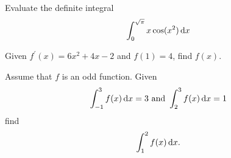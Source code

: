 \documentclass[12pt]{amsart}
\begin{document}
\vspace{3in}

\begin{thm}[10 Points]
  Evaluate the definite integral
  \[\int_0^{\sqrt{\pi}} x\cos(x^2)\dif x\]
\end{thm}

\newpage

\begin{thm}[10 Points]
  Given \(f^\prime(x) = 6x^2 + 4x - 2\) and \(f(1) = 4\), find \(f(x)\).
\end{thm}

\vspace{3in}

\begin{thm}[10 Points]
  Assume that \(f\) is an odd function.
  Given
  \[\int_{-1}^3 f(x)\dif x = 3\ \text{and}\ \int_2^{3} f(x)\dif x = 1\]
  find
  \[\int_1^{2} f(x)\dif x.\]
\end{thm}
\end{document}
